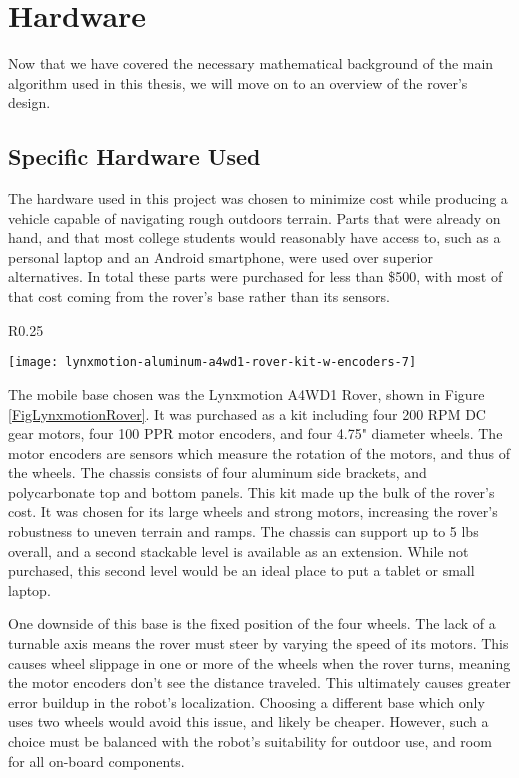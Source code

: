 \chapter{Hardware}

Now that we have covered the necessary mathematical background of the main algorithm used in this thesis, we will move on to an overview of the rover's design. 
\section{Specific Hardware Used} \label{sectionSpecificHardware}
The hardware used in this project was chosen to minimize cost while producing a vehicle capable of navigating rough outdoors terrain. Parts that were already on hand, and that most college students would reasonably have access to, such as a personal laptop and an Android smartphone, were used over superior alternatives. In total these parts were purchased for less than \$500, with most of that cost coming from the rover's base rather than its sensors.

\begin{wrapfigure}{R}{0.25\textwidth} %
	\caption{\cite{fig_lynxmotion_rover}}
	\centering
	\texttt{[image: lynxmotion-aluminum-a4wd1-rover-kit-w-encoders-7]}
	\label{FigLynxmotionRover}
\end{wrapfigure}

The mobile base chosen was the Lynxmotion A4WD1 Rover, shown in Figure \ref{FigLynxmotionRover}. It was purchased as a kit including four 200 RPM DC gear motors, four 100 PPR motor encoders, and four 4.75" diameter wheels. The motor encoders are sensors which measure the rotation of the motors, and thus of the wheels. The chassis consists of four aluminum side brackets, and polycarbonate top and bottom panels. This kit made up the bulk of the rover's cost. It was chosen for its large wheels and strong motors, increasing the rover's robustness to uneven terrain and ramps. The chassis can support up to 5 lbs overall, and a second stackable level is available as an extension. While not purchased, this second level would be an ideal place to put a tablet or small laptop.

One downside of this base is the fixed position of the four wheels. The lack of a turnable axis means the rover must steer by varying the speed of its motors. This causes wheel slippage in one or more of the wheels when the rover turns, meaning the motor encoders don't see the distance traveled. This ultimately causes greater error buildup in the robot's localization. Choosing a different base which only uses two wheels would avoid this issue, and likely be cheaper. However, such a choice must be balanced with the robot's suitability for outdoor use, and room for all on-board components.

